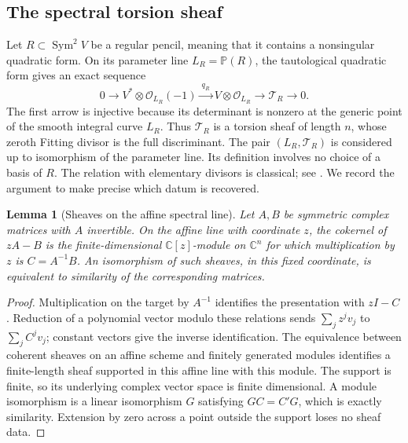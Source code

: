 \documentclass[11pt,reqno]{amsart}
\numberwithin{equation}{section}
\newtheorem{lemma}[theorem]{Lemma}
\theoremstyle{definition}\newtheorem{definition}[theorem]{Definition}
\theoremstyle{remark}\newtheorem{remark}[theorem]{Remark}
\newcommand{\C}{\mathbb C}\newcommand{\Q}{\mathbb Q}
\newcommand{\Pj}{\mathbb P}\newcommand{\A}{\mathbb A}
\newcommand{\OO}{\mathcal O}\newcommand{\II}{\mathcal I}
\DeclareMathOperator{\Sym}{Sym}\DeclareMathOperator{\Gr}{Gr}
\begin{document}
\subsection{The spectral torsion sheaf}

Let \(R\subset\Sym^2V\) be a regular pencil, meaning that it
contains a nonsingular quadratic form.  On its parameter line
\(L_R=\Pj(R)\), the tautological quadratic form gives an exact sequence
\begin{equation}\label{eq:spectral-torsion-sequence}
 0\longrightarrow V^*\otimes\OO_{L_R}(-1)
 \xrightarrow{\ q_R\ }V\otimes\OO_{L_R}
 \longrightarrow\mathcal T_R\longrightarrow0.
\end{equation}
The first arrow is injective because its determinant is nonzero at the
generic point of the smooth integral curve \(L_R\).  Thus
\(\mathcal T_R\) is a torsion sheaf of length \(n\), whose
zeroth Fitting divisor is the full discriminant.  The pair
\((L_R,\mathcal T_R)\) is considered up to isomorphism of the
parameter line.  Its definition involves no choice of a basis of \(R\).
The relation with elementary divisors is classical; see
\cite[\S2, Corollary~2.1 and equation~(5)]{FevolaMandelshtamSturmfels}.
We record the argument to make precise which datum is recovered.

\begin{lemma}[Sheaves on the affine spectral line]
\label{lem:spectral-sheaf-similarity}
Let \(A,B\) be symmetric complex matrices with \(A\) invertible.
On the affine line with coordinate \(z\), the cokernel of
\(zA-B\) is the finite-dimensional \(\C[z]\)-module on
\(\C^n\) for which multiplication by \(z\) is
\(C=A^{-1}B\).  An isomorphism of such sheaves, in this fixed
coordinate, is equivalent to similarity of the corresponding matrices.
\end{lemma}
\begin{proof}
Multiplication on the target by \(A^{-1}\) identifies the
presentation with \(zI-C\).  Reduction of a polynomial vector
modulo these relations sends \(\sum_jz^jv_j\) to
\(\sum_jC^jv_j\); constant vectors give the inverse identification.
The equivalence between coherent sheaves on an affine scheme and
finitely generated modules identifies a finite-length sheaf supported
in this affine line with this module.  The support is finite, so its
underlying complex vector space is finite dimensional.  A module
isomorphism is a linear isomorphism \(G\) satisfying
\(GC=C'G\), which is exactly similarity.  Extension by zero across
a point outside the support loses no sheaf data.
\end{proof}
\end{document}
